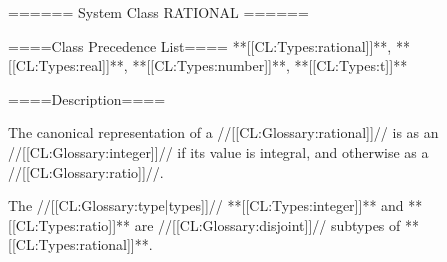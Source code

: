 ====== System Class RATIONAL ======

====Class Precedence List==== **[[CL:Types:rational]]**, **[[CL:Types:real]]**, **[[CL:Types:number]]**, **[[CL:Types:t]]**

====Description====

The canonical representation of a //[[CL:Glossary:rational]]// is as an //[[CL:Glossary:integer]]// if its value is integral, and otherwise as a //[[CL:Glossary:ratio]]//.

The //[[CL:Glossary:type|types]]// **[[CL:Types:integer]]** and **[[CL:Types:ratio]]** are //[[CL:Glossary:disjoint]]// subtypes of **[[CL:Types:rational]]**.


